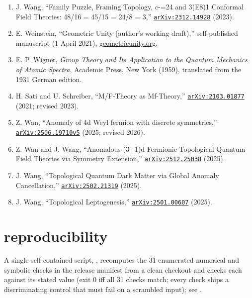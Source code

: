 \documentclass[11pt]{article}
\theoremstyle{remark}
\begin{document}
\begin{enumerate}[leftmargin=2em]
\item J. Wang, ``Family Puzzle, Framing Topology, c-=24 and 3(E8)1 Conformal Field Theories: 48/16 = 45/15 = 24/8 = 3,'' \href{https://arxiv.org/abs/2312.14928}{\nolinkurl{arXiv:2312.14928}} (2023).
\item E. Weinstein, ``Geometric Unity (author's working draft),'' self-published manuscript (1 April 2021), \href{https://geometricunity.org/}{geometricunity.org}.
\item E. P. Wigner, \emph{Group Theory and Its Application to the Quantum Mechanics of Atomic Spectra}, Academic Press, New York (1959), translated from the 1931 German edition.
\item H. Sati and U. Schreiber, ``M/F-Theory as Mf-Theory,'' \href{https://arxiv.org/abs/2103.01877}{\nolinkurl{arXiv:2103.01877}} (2021; revised 2023).
\item Z. Wan, ``Anomaly of 4d Weyl fermion with discrete symmetries,'' \href{https://arxiv.org/abs/2506.19710}{\nolinkurl{arXiv:2506.19710v5}} (2025; revised 2026).
\item Z. Wan and J. Wang, ``Anomalous (3+1)d Fermionic Topological Quantum Field Theories via Symmetry Extension,'' \href{https://arxiv.org/abs/2512.25038}{\nolinkurl{arXiv:2512.25038}} (2025).
\item J. Wang, ``Topological Quantum Dark Matter via Global Anomaly Cancellation,'' \href{https://arxiv.org/abs/2502.21319}{\nolinkurl{arXiv:2502.21319}} (2025).
\item J. Wang, ``Topological Leptogenesis,'' \href{https://arxiv.org/abs/2501.00607}{\nolinkurl{arXiv:2501.00607}} (2025).
\end{enumerate}
\appendix
\section{reproducibility}
A single self-contained script, , recomputes the 31 enumerated numerical and symbolic checks in the release manifest from a clean checkout and checks each against its stated value (exit 0 iff all 31 checks match; every check ships a discriminating control that must fail on a scrambled input); see .
\end{document}
